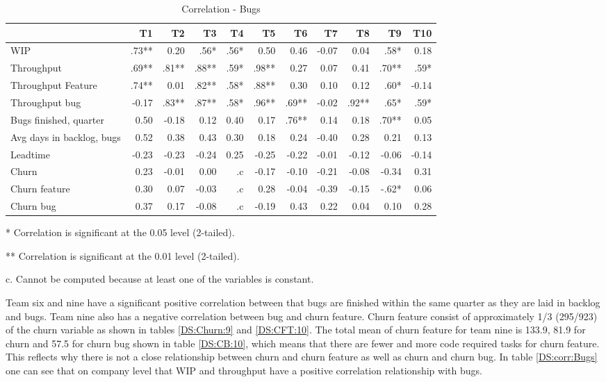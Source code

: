 \documentclass[UKenglish]{ifimaster}  %
\begin{document}
\begin{table}[!htbp]
 \begin{adjustwidth}{-2.5cm}{}
 \centering
 \begin{tabular}{|l|r|r|r|r|r|r|r|r|r|r|}
\hline
 & T1 & T2 & T3 & T4 & T5 & T6 & T7 & T8 & T9 & T10\\ \hline
WIP &.73**& 0.20& .56*& .56*& 0.50& 0.46& -0.07& 0.04& .58*& 0.18\\ \hline
Throughput &.69**& .81**& .88**& .59*& .98**& 0.27& 0.07& 0.41& .70**& .59*\\ \hline
Throughput Feature &.74**& 0.01& .82**& .58*& .88**& 0.30& 0.10& 0.12& .60*& -0.14\\ \hline
Throughput bug &-0.17& .83**& .87**& .58*& .96**& .69**& -0.02& .92**& .65*& .59*\\ \hline
Bugs finished, quarter &0.50& -0.18& 0.12& 0.40& 0.17& .76**& 0.14& 0.18& .70**& 0.05\\ \hline
Avg days in backlog, bugs &0.52& 0.38& 0.43& 0.30& 0.18& 0.24& -0.40& 0.28& 0.21& 0.13\\ \hline
Leadtime &-0.23& -0.23& -0.24& 0.25& -0.25& -0.22& -0.01& -0.12& -0.06& -0.14\\ \hline
Churn &0.23& -0.01& 0.00& .c& -0.17& -0.10& -0.21& -0.08& -0.34& 0.31\\ \hline
Churn feature &0.30& 0.07& -0.03& .c& 0.28& -0.04& -0.39& -0.15& -.62*& 0.06\\ \hline
Churn bug &0.37& 0.17& -0.08& .c
& -0.19& 0.43& 0.22& 0.04& 0.10& 0.28\\ \hline
\end{tabular}
 \caption{Correlation - Bugs}
 \label{corr:bug}
 \centerline {* Correlation is significant at the 0.05 level (2-tailed).}
\centerline{** Correlation is significant at the 0.01 level (2-tailed).}
\centerline{c. Cannot be computed because at least one of the variables is constant.}
\end{adjustwidth}
\end{table}


Team six and nine have a significant positive correlation between that bugs are finished within the same quarter as they are laid in backlog and bugs. Team nine also has a negative correlation between bug and churn feature. Churn feature consist of approximately 1/3 (295/923) of the churn variable as shown in tables \ref{DS:Churn:9} and \ref{DS:CFT:10}.  The total mean of churn feature for team nine is 133.9, 81.9 for churn and 57.5 for churn bug shown in table \ref{DS:CB:10}, which means that there are fewer and more code required tasks for churn feature. This reflects why there is not a close relationship between churn and churn feature as well as churn and churn bug. 
In table \ref{DS:corr:Bugs} one can see that on company level that WIP and throughput have a positive correlation relationship with bugs.  
\end{document}
